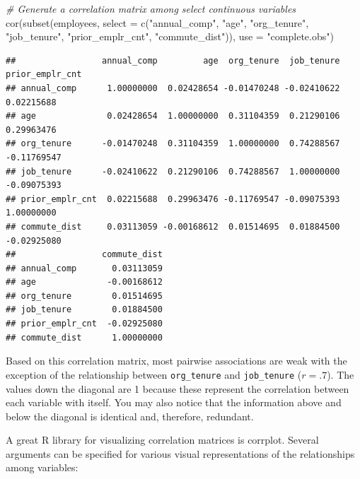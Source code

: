 \documentclass[
]{book}
\newenvironment{Shaded}{\begin{snugshade}}{\end{snugshade}}
\newcommand{\AttributeTok}[1]{\textcolor[rgb]{0.77,0.63,0.00}{#1}}
\newcommand{\CommentTok}[1]{\textcolor[rgb]{0.56,0.35,0.01}{\textit{#1}}}
\newcommand{\FunctionTok}[1]{\textcolor[rgb]{0.00,0.00,0.00}{#1}}
\newcommand{\NormalTok}[1]{#1}
\newcommand{\StringTok}[1]{\textcolor[rgb]{0.31,0.60,0.02}{#1}}
\begin{document}
\begin{Shaded}
\begin{Highlighting}[]
\CommentTok{\# Generate a correlation matrix among select continuous variables}
\FunctionTok{cor}\NormalTok{(}\FunctionTok{subset}\NormalTok{(employees, }\AttributeTok{select =} \FunctionTok{c}\NormalTok{(}\StringTok{"annual\_comp"}\NormalTok{, }\StringTok{"age"}\NormalTok{, }\StringTok{"org\_tenure"}\NormalTok{, }\StringTok{"job\_tenure"}\NormalTok{, }\StringTok{"prior\_emplr\_cnt"}\NormalTok{, }\StringTok{"commute\_dist"}\NormalTok{)), }\AttributeTok{use =} \StringTok{"complete.obs"}\NormalTok{)}
\end{Highlighting}
\end{Shaded}

\begin{verbatim}
##                 annual_comp         age  org_tenure  job_tenure prior_emplr_cnt
## annual_comp      1.00000000  0.02428654 -0.01470248 -0.02410622      0.02215688
## age              0.02428654  1.00000000  0.31104359  0.21290106      0.29963476
## org_tenure      -0.01470248  0.31104359  1.00000000  0.74288567     -0.11769547
## job_tenure      -0.02410622  0.21290106  0.74288567  1.00000000     -0.09075393
## prior_emplr_cnt  0.02215688  0.29963476 -0.11769547 -0.09075393      1.00000000
## commute_dist     0.03113059 -0.00168612  0.01514695  0.01884500     -0.02925080
##                 commute_dist
## annual_comp       0.03113059
## age              -0.00168612
## org_tenure        0.01514695
## job_tenure        0.01884500
## prior_emplr_cnt  -0.02925080
## commute_dist      1.00000000
\end{verbatim}

Based on this correlation matrix, most pairwise associations are weak with the exception of the relationship between \texttt{org\_tenure} and \texttt{job\_tenure} (\(r = .7\)). The values down the diagonal are 1 because these represent the correlation between each variable with itself. You may also notice that the information above and below the diagonal is identical and, therefore, redundant.

A great R library for visualizing correlation matrices is corrplot. Several arguments can be specified for various visual representations of the relationships among variables:
\end{document}
